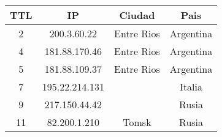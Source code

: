 \begin{tabular}{|c|c|c|c|}
	\hline
	TTL & IP & Ciudad & Pais \\
	\hline
	2 & 200.3.60.22 & Entre Rios & Argentina \\
	\hline
	4 & 181.88.170.46 & Entre Rios & Argentina \\
	\hline
	5 & 181.88.109.37 & Entre Rios & Argentina \\
	\hline
	7 & 195.22.214.131 &  & Italia \\
	\hline
	9 & 217.150.44.42 &  & Rusia \\
	\hline
	11 & 82.200.1.210 & Tomsk & Rusia \\
	\hline
\end{tabular}
